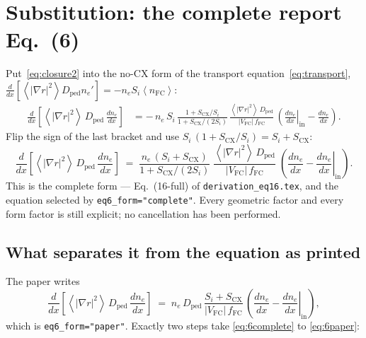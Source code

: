 \documentclass[11pt]{article}
\renewcommand{\ne}{n_{e}}  %
\newcommand{\nfc}{n_{\mathrm{FC}}}
\newcommand{\Vfc}{\lvert V_{\mathrm{FC}}\rvert}
\newcommand{\Si}{S_{i}}
\newcommand{\Scx}{S_{\mathrm{CX}}}
\newcommand{\Dped}{D_{\mathrm{ped}}}
\newcommand{\fFC}{f_{\mathrm{FC}}}
\newcommand{\fsa}[1]{\left\langle #1 \right\rangle}
\newcommand{\gradrsq}{\fsa{|\nabla r|^{2}}}
\newcommand{\dnein}{\left.\frac{d\ne}{dx}\right|_{\mathrm{in}}}
\begin{document}
\section{Substitution: the complete report Eq.~(6)}
\label{sec:complete}

Put~\eqref{eq:closure2} into the no-CX form of the transport
equation~\eqref{eq:transport}, $\frac{d}{dx}[\gradrsq\Dped\ne'] =
-\ne\Si\fsa{\nfc}$:
\begin{align}
  \frac{d}{dx}\!\left[\gradrsq\,\Dped\,\frac{d\ne}{dx}\right]
    &= -\,\ne\,\Si\,\frac{1+\Scx/\Si}{1+\Scx/(2\Si)}\,
         \frac{\gradrsq\,\Dped}{\Vfc\,\fFC}\,
         \left(\dnein - \frac{d\ne}{dx}\right).
\end{align}
Flip the sign of the last bracket and use
$\Si\,(1+\Scx/\Si) = \Si+\Scx$:
\begin{equation}
  \boxed{\;
  \frac{d}{dx}\!\left[\gradrsq\,\Dped\,\frac{d\ne}{dx}\right]
    \;=\; \frac{\ne\,(\Si+\Scx)}{1+\Scx/(2\Si)}\;
          \frac{\gradrsq\,\Dped}{\Vfc\,\fFC}\;
          \left(\frac{d\ne}{dx} - \dnein\right).
  \;}
  \label{eq:6complete}
\end{equation}
This is the complete form --- Eq.~(16-full) of
\texttt{derivation\_eq16.tex}, and the equation selected by
\texttt{eq6\_form="complete"}.  Every geometric factor and every form
factor is still explicit; no cancellation has been performed.

\subsection{What separates it from the equation as printed}
\label{sec:vs-paper}

The paper writes
\begin{equation}
  \frac{d}{dx}\!\left[\gradrsq\,\Dped\,\frac{d\ne}{dx}\right]
    \;=\; \ne\,\Dped\,\frac{\Si+\Scx}{\Vfc\,\fFC}\,
          \left(\frac{d\ne}{dx} - \dnein\right),
  \label{eq:6paper}
\end{equation}
which is \texttt{eq6\_form="paper"}.  Exactly two steps take
\eqref{eq:6complete} to \eqref{eq:6paper}:
\end{document}
